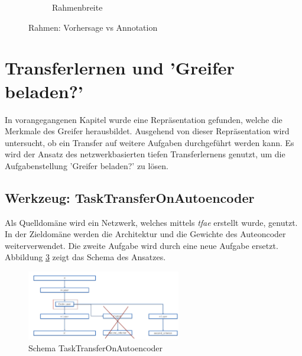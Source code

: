 \begin{figure}[h]
\begin{subfigure}[c]{0.32\textwidth}
			\caption{Rahmenbreite}
			\label{img:Rahmenbreite}	
		\end{subfigure}
		\caption{Rahmen: Vorhersage vs Annotation}
		\label{img:FehlerursacheMTLGrapple}
	\end{figure}
	
	
	\section{Transferlernen und 'Greifer beladen?'}
	\label{sec:TransferLearningGrappleLoaded}
	In vorangegangenen Kapitel wurde eine Repräsentation gefunden, welche die Merkmale des Greifer herausbildet. Ausgehend von dieser Repräsentation wird untersucht, ob ein Transfer auf weitere Aufgaben durchgeführt werden kann. Es wird der Ansatz des netzwerkbasierten tiefen Transferlernens genutzt, um die Aufgabenstellung 'Greifer beladen?' zu lösen.
	
	\subsection{Werkzeug: TaskTransferOnAutoencoder}
	\label{sec:TransferSecondCriterionAutoenocder}		
	Als Quelldomäne wird ein Netzwerk, welches mittels \textit{\ac{tfae}} erstellt wurde, genutzt. In der Zieldomäne werden die Architektur und die Gewichte des Auteoncoder weiterverwendet. Die zweite Aufgabe wird durch eine neue Aufgabe ersetzt. Abbildung \ref{img:SchemaTTAE} zeigt das Schema des Ansatzes. 
	\begin{figure}[h]
		\centering
		\includegraphics[width=0.6\textwidth, center]{bilder/Schema_Autoencoders/Schema_TSCAE.png}
		\caption[Schema TaskTransferOnAutoencoder]{Schema TaskTransferOnAutoencoder}
		\label{img:SchemaTTAE}
	\end{figure}

